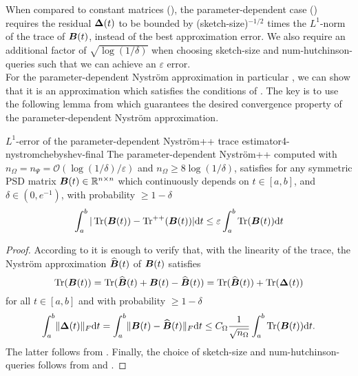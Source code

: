 When compared to constant matrices (),
the parameter-dependent case ()
requires the residual $\boldsymbol{\Delta}(t)$ to be bounded by
(\gls{sketch-size})$^{-1/2}$ times the $L^1$-norm of the
trace of $\boldsymbol{B}(t)$, instead of the best approximation error.
We also require an additional factor of $\sqrt{\log(1/\delta)}$ when choosing
\gls{sketch-size} and \gls{num-hutchinson-queries} such that we can achieve
an $\varepsilon$ error.\\

For the parameter-dependent Nystr\"om approximation in particular ,
we can show that it is an approximation which satisfies the conditions
of . The key is to use the following
lemma from \cite{he2023parameter} which guarantees the desired
convergence property of the parameter-dependent Nystr\"om approximation.

\begin{theorem}{$L^1$-error of the parameter-dependent Nystr\"om++ trace estimator}{4-nystromchebyshev-final}
    The parameter-dependent Nystr\"om++ computed with
    $n_{\Omega} = n_{\Psi} = \mathcal{O}\left( \log(1/\delta) / \varepsilon \right)$
    and $n_{\Omega} \geq 8 \log(1/\delta)$,
    satisfies for any symmetric \gls{PSD} matrix $\boldsymbol{B}(t) \in \mathbb{R}^{n \times n}$ which continuously
    depends on $t \in [a, b]$, and $\delta \in (0, e^{-1})$, with probability
    $\geq 1 - \delta$
    \begin{equation}
        \int_{a}^{b} |\operatorname{Tr}(\boldsymbol{B}(t)) - \operatorname{Tr}^{++}(\boldsymbol{B}(t))| \mathrm{d}t \leq \varepsilon \int_{a}^{b}\operatorname{Tr}(\boldsymbol{B}(t)) \mathrm{d}t
    \end{equation}
\end{theorem}

\begin{proof}
    According to 
    it is enough to verify that, with the linearity of the trace, the Nystr\"om
    approximation $\widehat{\boldsymbol{B}}(t)$ of $\boldsymbol{B}(t)$ satisfies 
    \begin{equation}
        \operatorname{Tr}(\boldsymbol{B}(t)) = \operatorname{Tr}(\widehat{\boldsymbol{B}}(t) + \boldsymbol{B}(t) - \widehat{\boldsymbol{B}}(t)) = \operatorname{Tr}(\widehat{\boldsymbol{B}}(t)) + \operatorname{Tr}(\boldsymbol{\Delta}(t))
    \end{equation}
    for all $t \in [a, b]$ and with probability $\geq 1 - \delta$
    \begin{equation}
        \int_{a}^{b} \lVert \boldsymbol{\Delta}(t) \rVert _F \mathrm{d}t = \int_{a}^{b} \lVert \boldsymbol{B}(t) - \widehat{\boldsymbol{B}}(t) \rVert _F \mathrm{d}t \leq C_{\Omega} \frac{1}{\sqrt{n_{\Omega}}} \int_{a}^{b} \operatorname{Tr}(\boldsymbol{B}(t)) \mathrm{d}t.
    \end{equation}
    The latter follows from . Finally,
    the choice of \gls{sketch-size} and \gls{num-hutchinson-queries} follows
    from 
    and .
\end{proof}

